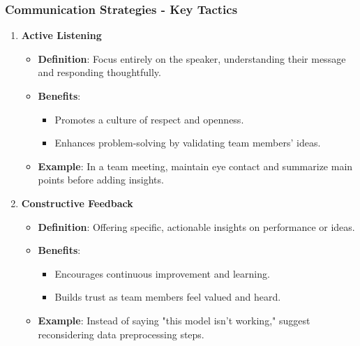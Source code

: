 \documentclass[aspectratio=169]{beamer}
\begin{document}
\begin{frame}[fragile]
    \frametitle{Communication Strategies - Key Tactics}
    \begin{enumerate}
        \item \textbf{Active Listening}
            \begin{itemize}
                \item \textbf{Definition}: Focus entirely on the speaker, understanding their message and responding thoughtfully.
                \item \textbf{Benefits}:
                    \begin{itemize}
                        \item Promotes a culture of respect and openness.
                        \item Enhances problem-solving by validating team members’ ideas.
                    \end{itemize}
                \item \textbf{Example}: In a team meeting, maintain eye contact and summarize main points before adding insights.
            \end{itemize}
        
        \item \textbf{Constructive Feedback}
            \begin{itemize}
                \item \textbf{Definition}: Offering specific, actionable insights on performance or ideas.
                \item \textbf{Benefits}:
                    \begin{itemize}
                        \item Encourages continuous improvement and learning.
                        \item Builds trust as team members feel valued and heard.
                    \end{itemize}
                \item \textbf{Example}: Instead of saying "this model isn't working," suggest reconsidering data preprocessing steps.
            \end{itemize}
    \end{enumerate}
\end{frame}
\end{document}
